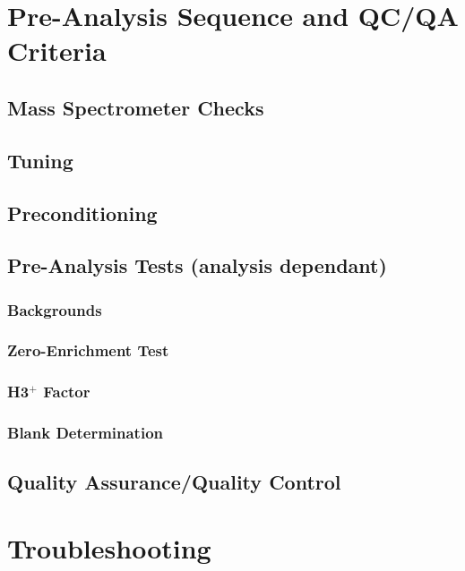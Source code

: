\documentclass[12pt]{../SOP4_alpha}\usepackage[]{graphicx}\usepackage[]{color}
\begin{document}
\newpage

\section{Pre-Analysis Sequence and QC/QA Criteria}

\subsection{Mass Spectrometer Checks}

\subsection{Tuning}

\subsection{Preconditioning}

\subsection{Pre-Analysis Tests (analysis dependant)}

\subsubsection{Backgrounds}

\subsubsection{Zero-Enrichment Test}

\subsubsection{H3$^+$ Factor}

\subsubsection{Blank Determination}

\subsection{Quality Assurance/Quality Control}

\section{Troubleshooting}
\end{document}
